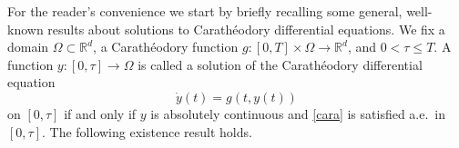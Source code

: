 \documentclass[A4paper,11pt]{article}
\newtheorem{theorem}{Theorem}[section]
\theoremstyle{definition}
\newcommand{\R}{\mathbb{R}}
\begin{document}
For the reader's convenience we start by briefly recalling some general, well-known results about solutions to Carath{\'e}odory differential equations. We fix a domain $\Omega \subset \R^d$, a Carath{\'e}odory function $g\colon[0,T]\times \Omega \to \R^d$, and $0<\tau \le T$. A function $y\colon [0,\tau]\to \Omega$ is called a solution of the Carath{\'e}odory differential equation
\begin{equation}\label{cara}
\dot y(t)=g(t, y(t))
\end{equation}
on $[0,\tau]$ if and only if $y$ is absolutely continuous and \eqref{cara} is satisfied a.e.\ in $[0,\tau]$.
The following existence result holds.
%
%
%
\end{document}
